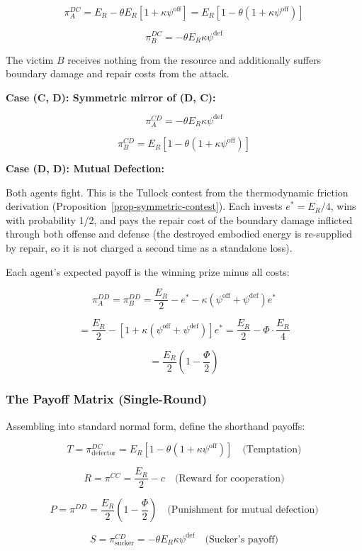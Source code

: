 \documentclass[11pt]{article}
\theoremstyle{plain}
\theoremstyle{definition}
\theoremstyle{remark}
\let\origsubsubsection\subsubsection
\renewcommand{\subsubsection}{\needspace{4\baselineskip}\origsubsubsection}
\begin{document}
\[\pi_A^{DC} = E_R - \theta E_R \left[1 + \kappa\psi^{\text{off}}\right] = E_R\left[1 - \theta(1 + \kappa\psi^{\text{off}})\right]\]

\[\pi_B^{DC} = -\theta E_R \kappa\psi^{\text{def}}\]

The victim \(B\) receives nothing from the resource and additionally
suffers boundary damage and repair costs from the attack.

\textbf{Case (C, D): Symmetric mirror of (D, C):}

\[\pi_A^{CD} = -\theta E_R \kappa\psi^{\text{def}}\]

\[\pi_B^{CD} = E_R\left[1 - \theta(1 + \kappa\psi^{\text{off}})\right]\]

\textbf{Case (D, D): Mutual Defection:}

Both agents fight. This is the Tullock contest from the thermodynamic
friction derivation (Proposition~\ref{prop-symmetric-contest}). Each
invests \(e^* = E_R/4\), wins with probability 1/2, and pays the repair
cost of the boundary damage inflicted through both offense and defense
(the destroyed embodied energy is re-supplied by repair, so it is not
charged a second time as a standalone loss).

Each agent's expected payoff is the winning prize minus all costs:

\[\pi_A^{DD} = \pi_B^{DD} = \frac{E_R}{2} - e^* - \kappa(\psi^{\text{off}} + \psi^{\text{def}}) e^*\]

\[= \frac{E_R}{2} - \left[1 + \kappa(\psi^{\text{off}} + \psi^{\text{def}})\right] e^* = \frac{E_R}{2} - \Phi \cdot \frac{E_R}{4}\]

\[= \frac{E_R}{2}\left(1 - \frac{\Phi}{2}\right)\]

\subsubsection{The Payoff Matrix
(Single-Round)}\label{the-payoff-matrix-single-round}

Assembling into standard normal form, define the shorthand payoffs:

\[T = \pi^{DC}_{\text{defector}} = E_R\left[1 - \theta(1 + \kappa\psi^{\text{off}})\right] \quad \text{(Temptation)}\]

\[R = \pi^{CC} = \frac{E_R}{2} - c \quad \text{(Reward for cooperation)}\]

\[P = \pi^{DD} = \frac{E_R}{2}\left(1 - \frac{\Phi}{2}\right) \quad \text{(Punishment for mutual defection)}\]

\[S = \pi^{CD}_{\text{sucker}} = -\theta E_R \kappa\psi^{\text{def}} \quad \text{(Sucker's payoff)}\]
\end{document}
